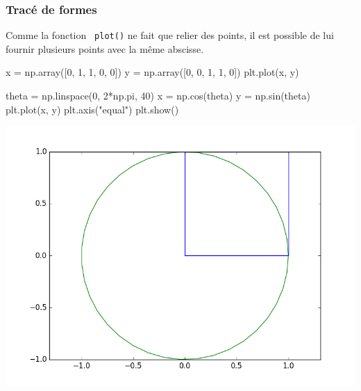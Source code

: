 \begin{frame}[fragile]
\frametitle{Tracé de formes}

Comme la fonction \verb? plot()? ne fait que relier des points, il est possible de lui fournir plusieurs points avec la même abscisse.

\begin{minipage}{0.6\linewidth}
\begin{GrayBox}[0.85\textwidth]
\begin{verbatimtab}[3]
x = np.array([0, 1, 1, 0, 0])
y = np.array([0, 0, 1, 1, 0])
plt.plot(x, y)

theta = np.linspace(0, 2*np.pi, 40)
x = np.cos(theta)
y = np.sin(theta)
plt.plot(x, y)
plt.axis("equal")
plt.show()
\end{verbatimtab}
\end{GrayBox}
\end{minipage}\hfill
\begin{minipage}{0.36\linewidth}
\begin{center}
 \includegraphics[width=1\linewidth]{img/courbe5}
\end{center}
\end{minipage}

\end{frame}

